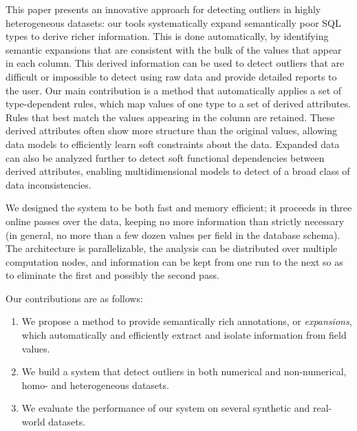 This paper presents an innovative approach for detecting outliers in highly heterogeneous datasets: our tools systematically expand semantically poor SQL types to derive richer information.
This is done automatically, by identifying semantic expansions that are consistent with the bulk of the values that appear in each column.
This derived information can be used to detect outliers that are difficult or impossible to detect using raw data and provide detailed reports to the user. 
Our main contribution is a method that automatically applies a set of type-dependent rules, which map values of one type to a set of derived attributes.
Rules that best match the values appearing in the column are retained.
These derived attributes often show more structure than the original values, allowing data models to efficiently learn soft constraints about the data. 
Expanded data can also be analyzed further to detect soft functional dependencies between derived attributes, enabling multidimensional models to detect of a broad class of data inconsistencies.

We designed the system to be both fast and memory efficient; it proceeds in three online passes over the data, keeping no more information than strictly necessary (in general, no more than a few dozen values per field in the database schema). The architecture is parallelizable, the analysis can be distributed over multiple computation nodes, and information can be kept from one run to the next so as to eliminate the first and possibly the second pass.

Our contributions are as follows:
\begin{enumerate}
\item We propose a method to provide semantically rich annotations, or \emph{expansions}, which automatically and efficiently extract and isolate information from field values.
\item We build a system that detect outliers in both numerical and non-numerical, homo- and heterogeneous datasets.
\item We evaluate the performance of our system on several synthetic and real-world datasets.
\end{enumerate}

